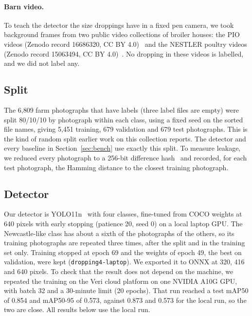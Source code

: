 \paragraph{Barn video.} To teach the detector the size droppings have in a fixed pen camera, we took background
frames from two public video collections of broiler houses: the PIO videos (Zenodo record 16686320, CC BY
4.0)~\cite{boniche2025piodata,boniche2026pio} and the NESTLER poultry videos (Zenodo record 15063494, CC BY 4.0)~\cite{nestler2025}. No dropping in these
videos is labelled, and we did not label any.

\subsection{Split}
\label{sec:split}

The 6,809 farm photographs that have labels (three label files are empty) were split 80/10/10 by photograph within
each class, using a fixed seed on the sorted file names, giving 5,451 training, 679 validation and 679 test
photographs. This is the kind of random split earlier work
on this collection reports. The detector and every baseline in Section~\ref{sec:bench} use exactly this split. To
measure leakage, we reduced every photograph to a 256-bit difference hash~\cite{krawetz2013} and recorded, for
each test photograph, the Hamming distance to the closest training photograph.

\subsection{Detector}
\label{sec:detector}

Our detector is YOLO11n~\cite{jocher2024yolo11} with four classes, fine-tuned from COCO weights at 640 pixels with early stopping (patience 20, seed 0) on a local laptop GPU. The Newcastle-like class has about a sixth of the
photographs of the others, so its training photographs are repeated three times, after the split and in the training
set only. Training stopped at epoch 69 and the weights of epoch 49, the best on validation, were kept
(\texttt{dropping4-laptop}). We exported it to ONNX at 320, 416 and 640 pixels. To check that the result does not depend on the machine, we repeated the training on the Veri cloud
platform on one NVIDIA A10G GPU, with batch 32 and a 30-minute limit (20 epochs). That run reached a test mAP50
of 0.854 and mAP50-95 of 0.573, against 0.873 and 0.573 for the local run, so the two are close. All results below
use the local run.

